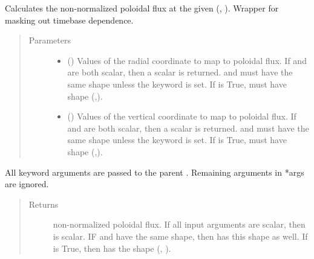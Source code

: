 \documentclass[letterpaper,10pt,english]{sphinxmanual}
\begin{document}
\begin{fulllineitems}
\begin{fulllineitems}
\label{\detokenize{eqtools:eqtools.eqdskreader.EqdskReader.rz2psi}}
Calculates the non-normalized poloidal flux at the given (, ).
Wrapper for
{\hyperref[\detokenize{eqtools:eqtools.core.Equilibrium.rz2psi}]{}} masking
out timebase dependence.
\begin{quote}\begin{description}
\item[{Parameters}] \leavevmode\begin{itemize}
\item {} 
 () \textendash{} Values of the radial coordinate to
map to poloidal flux.  If  and  are both scalar, then a
scalar  is returned.   and  must have the same shape
unless the  keyword is set.  If  is True,
 must have shape (,).

\item {} 
 () \textendash{} Values of the vertical coordinate to
map to poloidal flux.  If  and  are both scalar, then a
scalar  is returned.   and  must have the same shape
unless the  keyword is set.  If  is True,
 must have shape (,).

\end{itemize}

\end{description}\end{quote}

All keyword arguments are passed to the parent
{\hyperref[\detokenize{eqtools:eqtools.core.Equilibrium.rz2psi}]{}}.
Remaining arguments in *args are ignored.
\begin{quote}\begin{description}
\item[{Returns}] \leavevmode
non-normalized poloidal flux.  If
all input arguments are scalar, then  is scalar.  IF  and 
have the same shape, then  has this shape as well.  If 
is True, then  has the shape (, ).


\end{description}
\end{quote}
\end{fulllineitems}
\end{fulllineitems}
\end{document}
